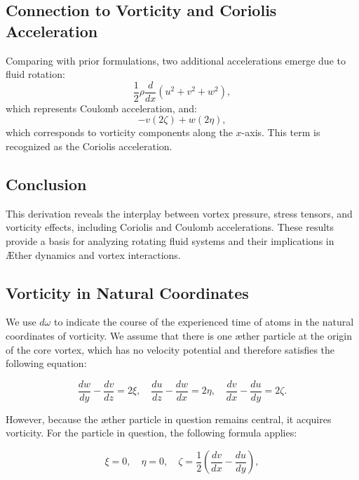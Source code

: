 \documentclass[a4paper,10pt]{article}
\begin{document}
    \subsection*{Connection to Vorticity and Coriolis Acceleration}
    Comparing with prior formulations, two additional accelerations emerge due to fluid rotation:
    \begin{equation*}
        \frac{1}{2} \rho \frac{d}{dx} (u^2 + v^2 + w^2),
    \end{equation*}
    which represents Coulomb acceleration, and:
    \begin{equation*}
        -v (2 \zeta) + w (2 \eta),
    \end{equation*}
    which corresponds to vorticity components along the $x$-axis. This term is recognized as the Coriolis acceleration.

    \subsection*{Conclusion}
    This derivation reveals the interplay between vortex pressure, stress tensors, and vorticity effects, including Coriolis and Coulomb accelerations. These results provide a basis for analyzing rotating fluid systems and their implications in Æther dynamics and vortex interactions.


    
\subsection{Vorticity in Natural Coordinates}


We use $d\omega$ to indicate the course of the experienced time of atoms in the natural coordinates of vorticity. We assume that there is one æther particle at the origin of the core vortex, which has no velocity potential and therefore satisfies the following equation:


\begin{equation*}
\frac{d w}{d y}-\frac{d v}{d z}=2 \xi, \quad \frac{d u}{d z}-\frac{d w}{d x}=2 \eta, \quad \frac{d v}{d x}-\frac{d u}{d y}=2 \zeta.
\end{equation*}


However, because the æther particle in question remains central, it acquires vorticity. For the particle in question, the following formula applies:


\begin{equation*}
\xi=0, \quad \eta=0, \quad \zeta=\frac{1}{2}\left(\frac{d v}{d x}-\frac{d u}{d y}\right),
\end{equation*}
\end{document}
